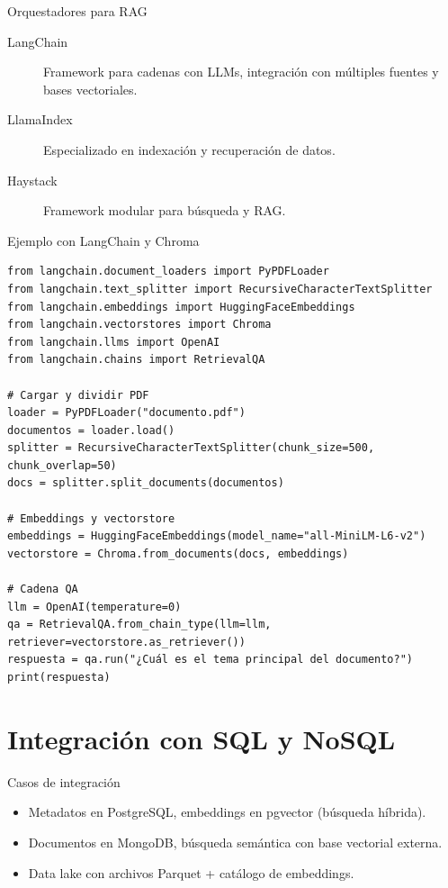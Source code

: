 \documentclass[aspectratio=169, 10pt, xcolor=table]{beamer}
\begin{document}
\begin{frame}{Orquestadores para RAG}
    \begin{description}
        \item[LangChain] Framework para cadenas con LLMs, integración con múltiples fuentes y bases vectoriales.
        \item[LlamaIndex] Especializado en indexación y recuperación de datos.
        \item[Haystack] Framework modular para búsqueda y RAG.
    \end{description}
\end{frame}

\begin{frame}[fragile]{Ejemplo con LangChain y Chroma}
    \begin{lstlisting}[style=python]
from langchain.document_loaders import PyPDFLoader
from langchain.text_splitter import RecursiveCharacterTextSplitter
from langchain.embeddings import HuggingFaceEmbeddings
from langchain.vectorstores import Chroma
from langchain.llms import OpenAI
from langchain.chains import RetrievalQA

# Cargar y dividir PDF
loader = PyPDFLoader("documento.pdf")
documentos = loader.load()
splitter = RecursiveCharacterTextSplitter(chunk_size=500, chunk_overlap=50)
docs = splitter.split_documents(documentos)

# Embeddings y vectorstore
embeddings = HuggingFaceEmbeddings(model_name="all-MiniLM-L6-v2")
vectorstore = Chroma.from_documents(docs, embeddings)

# Cadena QA
llm = OpenAI(temperature=0)
qa = RetrievalQA.from_chain_type(llm=llm, retriever=vectorstore.as_retriever())
respuesta = qa.run("¿Cuál es el tema principal del documento?")
print(respuesta)
    \end{lstlisting}
\end{frame}

\section{Integración con SQL y NoSQL}

\begin{frame}{Casos de integración}
    \begin{itemize}
        \item Metadatos en PostgreSQL, embeddings en pgvector (búsqueda híbrida).
        \item Documentos en MongoDB, búsqueda semántica con base vectorial externa.
        \item Data lake con archivos Parquet + catálogo de embeddings.
    \end{itemize}
\end{frame}
\end{document}
